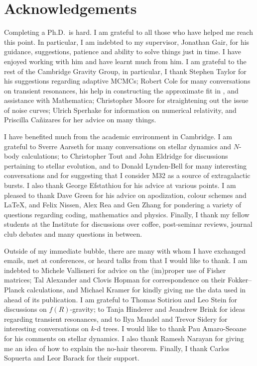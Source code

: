\chapter*{Acknowledgements}
\label{acknowledgements}

Completing a Ph.D.\ is hard. I am grateful to all those who have helped me reach this point. In particular, I am indebted to my supervisor, Jonathan Gair, for his guidance, suggestions, patience and ability to solve things just in time. I have enjoyed working with him and have learnt much from him. I am grateful to the rest of the Cambridge Gravity Group, in particular, I thank Stephen Taylor for his suggestions regarding adaptive MCMCs; Robert Cole for many conversations on transient resonances, his help in constructing the approximate fit in , and assistance with Mathematica; Christopher Moore for straightening out the issue of noise curves; Ulrich Sperhake for information on numerical relativity, and Priscilla Ca\~{n}izares for her advice on many things.

I have benefited much from the academic environment in Cambridge. I am grateful to Sverre Aarseth for many conversations on stellar dynamics and $N$-body calculations; to Christopher Tout and John Eldridge for discussions pertaining to stellar evolution, and to Donald Lynden-Bell for many interesting conversations and for suggesting that I consider M32 as a source of extragalactic bursts. I also thank George Efstathiou for his advice at various points. I am pleased to thank Dave Green for his advice on apodization, colour schemes and \LaTeX, and Felix Nissen, Alex Rea and Gen Zhang for pondering a variety of questions regarding coding, mathematics and physics. Finally, I thank my fellow students at the Institute for discussions over coffee, post-seminar reviews, journal club debates and many questions in between.

Outside of my immediate bubble, there are many with whom I have exchanged emails, met at conferences, or heard talks from that I would like to thank. I am indebted to Michele Vallisneri for advice on the (im)proper use of Fisher matrices; Tal Alexander and Clovis Hopman for correspondence on their Fokker--Planck calculations, and Michael Kramer for kindly giving me the data used in  ahead of its publication. I am grateful to Thomas Sotiriou and Leo Stein for discussions on $f(R)$-gravity; to Tanja Hinderer and Jeandrew Brink for ideas regarding transient resonances, and to Ilya Mandel and Trevor Sidery for interesting conversations on $k$-d trees. I would like to thank Pau Amaro-Seoane for his comments on stellar dynamics. I also thank Ramesh Narayan for giving me an idea of how to explain the no-hair theorem. Finally, I thank Carlos Sopuerta and Leor Barack for their support.

